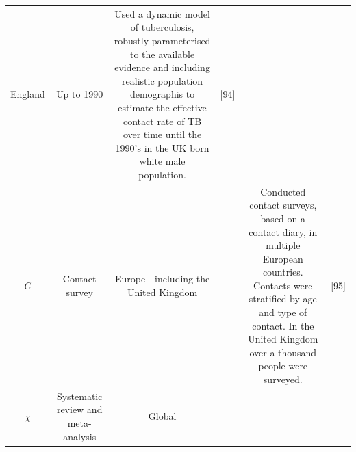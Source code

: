 \documentclass[11pt,twoside]{bristolthesis}
\begin{document}
\begin{longtable}[]{@{}cccccc@{}}
\begin{minipage}[t]{0.08\columnwidth}
  England\strut
  \end{minipage} & \begin{minipage}[t]{0.08\columnwidth}\centering
  Up to
  1990\strut
  \end{minipage} & \begin{minipage}[t]{0.29\columnwidth}\centering
  Used a dynamic model of tuberculosis,
  robustly parameterised to the available
  evidence and including realistic
  population demographis to estimate the
  effective contact rate of TB over time
  until the 1990's in the UK born white
  male population.\strut
  \end{minipage} & \begin{minipage}[t]{0.12\columnwidth}\centering
  {[}94{]}\strut
  \end{minipage}\tabularnewline
  \begin{minipage}[t]{0.16\columnwidth}\centering
  \(C\)\strut
  \end{minipage} & \begin{minipage}[t]{0.11\columnwidth}\centering
  Contact
  survey\strut
  \end{minipage} & \begin{minipage}[t]{0.08\columnwidth}\centering
  Europe -
  including
  the
  United
  Kingdom\strut
  \end{minipage} & \begin{minipage}[t]{0.08\columnwidth}\centering
  2005\strut
  \end{minipage} & \begin{minipage}[t]{0.29\columnwidth}\centering
  Conducted contact surveys, based on a
  contact diary, in multiple European
  countries. Contacts were stratified by
  age and type of contact. In the United
  Kingdom over a thousand people were
  surveyed.\strut
  \end{minipage} & \begin{minipage}[t]{0.12\columnwidth}\centering
  {[}95{]}\strut
  \end{minipage}\tabularnewline
  \begin{minipage}[t]{0.16\columnwidth}\centering
  \(\chi\)\strut
  \end{minipage} & \begin{minipage}[t]{0.11\columnwidth}\centering
  Systematic
  review and
  meta-analysis\strut
  \end{minipage} & \begin{minipage}[t]{0.08\columnwidth}\centering
  Global\strut
  \end{minipage} & \begin{minipage}[t]{0.08\columnwidth}\centering

\end{minipage}
\end{longtable}
\end{document}
